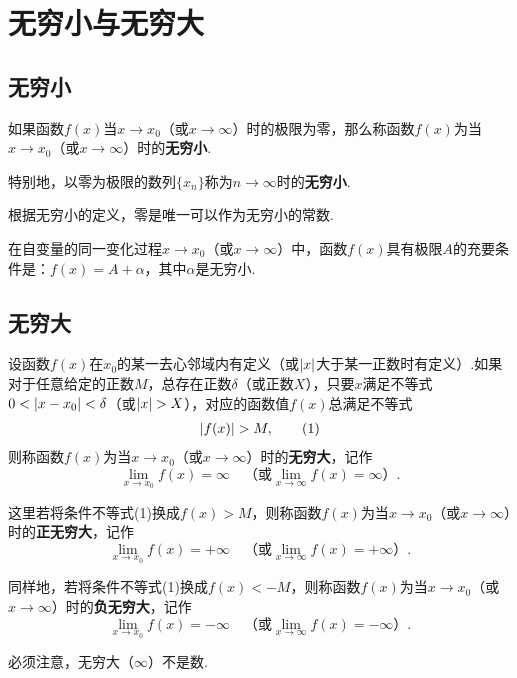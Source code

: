 \section{无穷小与无穷大}
\subsection{无穷小}
\begin{definition}
如果函数\(f(x)\)当\(x \to x_0\)（或\(x \to \infty\)）时的极限为零，那么称函数\(f(x)\)为当\(x \to x_0\)（或\(x \to \infty\)）时的\textbf{无穷小}.

特别地，以零为极限的数列\(\{x_n\}\)称为\(n \to \infty\)时的\textbf{无穷小}.
\end{definition}

根据无穷小的定义，零是唯一可以作为无穷小的常数.

\begin{theorem}
在自变量的同一变化过程\(x \to x_0\)（或\(x \to \infty\)）中，函数\(f(x)\)具有极限\(A\)的充要条件是：\(f(x) = A + \alpha\)，其中\(\alpha\)是无穷小.
\end{theorem}

\subsection{无穷大}
\begin{definition}
设函数\(f(x)\)在\(x_0\)的某一去心邻域内有定义（或\(\abs{x}\)大于某一正数时有定义）.如果对于任意给定的正数\(M\)，总存在正数\(\delta\)（或正数\(X\)），只要\(x\)满足不等式\(0 < \abs{x - x_0} < \delta\)（或\(\abs{x} > X\)），对应的函数值\(f(x)\)总满足不等式\begin{gather}
\abs{f(x)} > M, \tag1
\end{gather}则称函数\(f(x)\)为当\(x \to x_0\)（或\(x \to \infty\)）时的\textbf{无穷大}，记作\[
\lim\limits_{x \to x_0}f(x) = \infty
\quad\text{（或} \lim\limits_{x \to \infty}f(x) = \infty \text{）}.
\]

这里若将条件不等式(1)换成\(f(x) > M\)，则称函数\(f(x)\)为当\(x \to x_0\)（或\(x \to \infty\)）时的\textbf{正无穷大}，记作\[
\lim\limits_{x \to x_0}f(x) = +\infty
\quad\text{（或} \lim\limits_{x \to \infty}f(x) = +\infty \text{）}.
\]

同样地，若将条件不等式(1)换成\(f(x) < -M\)，则称函数\(f(x)\)为当\(x \to x_0\)（或\(x \to \infty\)）时的\textbf{负无穷大}，记作\[
\lim\limits_{x \to x_0}f(x) = -\infty
\quad\text{（或} \lim\limits_{x \to \infty}f(x) = -\infty \text{）}.
\]
\end{definition}
必须注意，无穷大（\(\infty\)）不是数.

